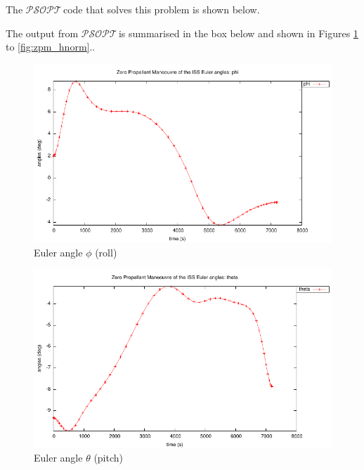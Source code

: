 \documentclass[a4paper,11pt]{report}    %
\newcommand{\psopt}{$\mathcal{PSOPT}$\,}  %
\newenvironment{shadedframe}{%
  \def\FrameCommand{\fcolorbox{black}{shadecolor}}%
  \MakeFramed {\FrameRestore}}
{\endMakeFramed}
\begin{document}
The \psopt code that solves this problem is shown below. 

\tiny
\begin{shadedframe}

\end{shadedframe}
\normalsize

The output from \psopt is summarised in the box below and shown in Figures \ref{fig:zpm_phi} to \ref{fig:zpm_hnorm}..

\begin{shadedframe}

\end{shadedframe}

\begin{figure}
  \centering 
  \includegraphics{../examples/zpm/zpm_phi}
  \caption{Euler angle $\phi$ (roll)}
 \label{fig:zpm_phi}
\end{figure}


\begin{figure}
  \centering
  \includegraphics{../examples/zpm/zpm_theta}
  \caption{Euler angle $\theta$ (pitch)}
 \label{fig:zpm_theta}
\end{figure}
\end{document}
